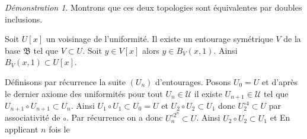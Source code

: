 \documentclass[a4paper, 11pt, french]{book}
\newenvironment{itemise}{\itemize}{\enditemize}
\theoremstyle{plain} %
\theoremstyle{definition} %
\theoremstyle{remark} %
\newtheorem*{demonstration}{Démonstration}
\renewcommand{\setminus}{\backslash}
\newcommand{\1}{\mathds{1}}
\newcommand{\et}{\mathrel{\mathrm{et}}}
\newcommand{\N}{\mathbb{N}}
\renewcommand{\frak}[1]{\mathfrak{#1}}
\newcommand{\scr}[1]{\mathscr{#1}}
\newcommand\ens[2]{\{#1 \ |\ #2\}}
\begin{document}
\begin{demonstration}
\begin{itemise}
\begin{itemise}
			Montrons que ces deux topologies sont équivalentes par doubles inclusions.
			\begin{itemise}
				\item Soit $U[x]$ un voisinage de l'uniformité.
				Il existe un entourage symétrique $V$ de la base $\frak{B}$ tel que $V\subset U$.
				Soit $y\in V[x]$ alors $y\in B_V(x, 1)$.
				Ainsi $B_V(x, 1)\subset U[x]$.
				\item Définisons par récurrence la suite $(U_n)$ d'entourages.
				Posons $U_0=U$ et d'après le dernier axiome des uniformités pour tout $U_n\in\scr{U}$ il existe $U_{n+1}\in\scr{U}$ tel que $U_{n+1}\circ U_{n+1}\subset U_n$.
				Ainsi $U_1\circ U_1\subset U_0=U$ et $U_2\circ U_2\subset U_1$ donc $U_2^{\circ 4}\subset U$ par associativité de $\circ$.
				Par récurrence on a donc $U_n^{\circ 2^n}\subset U$.
				Ainsi $U_2\circ U_2\subset U_1$ et
				En applicant $n$ fois le
			\end{itemise}
		\end{itemise}
	\end{itemise}
\end{demonstration}
\end{document}

